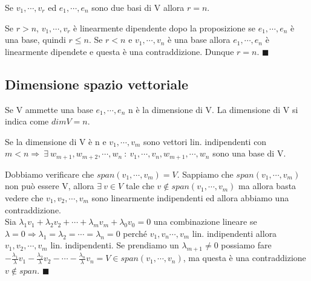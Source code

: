 \begin{corollaries}
Se $v_1, \cdots, v_r$ ed $e_1, \cdots, e_n$ sono due basi di V allora $r=n$.
\end{corollaries}

\begin{demostration}
Se $r>n$, $v_1, \cdots, v_r$ è linearmente dipendente dopo la proposizione se $e_1, \cdots, e_n$ è una base, quindi $r\leq n$. Se $r<n$ e $v_1, \cdots, v_n$ è una base allora $e_1, \cdots, e_n$ è linearmente dipendete e questa è una contraddizione. Dunque $r=n$. $\blacksquare$
\end{demostration}

\subsection{Dimensione spazio vettoriale}
\begin{definition}[Dimensione di un V]
Se V ammette una base $e_1, \cdots, e_n$ n è la dimensione di V. La dimensione di V si indica come $dim V = n$.
\end{definition}

\begin{corollaries}
Se la dimensione di V è n e $v_1, \cdots, v_m$ sono vettori lin. indipendenti con $m<n \Longrightarrow \:\exists\: w_{m+1}, w_{m+2}, \cdots, w_n \::\: v_1, \cdots, v_n, w_{m+1}, \cdots, w_n$ sono una base di V. 
\end{corollaries}

\begin{demostration}
Dobbiamo verificare che $span(v_1, \cdots, v_m) = V$. Sappiamo che $span(v_1, \cdots, v_m)$ non può essere V, allora $\exists\: v \in V$ tale che $v \notin span(v_1, \cdots, v_m)$ ma allora basta vedere che $v_1, v_2, \cdots, v_m$ sono linearmente indipendenti ed allora abbiamo una contraddizione.\\
Sia $\lambda_1v_1 + \lambda_2v_2 + \cdots + \lambda_mv_m + \lambda_0v_0 = 0$ una combinazione lineare se $\lambda=0 \Longrightarrow \lambda_1 = \lambda_2 = \cdots = \lambda_n = 0$ perché $v_1, v_n \cdots, v_m$ lin. indipendenti allora $v_1, v_2, \cdots, v_m$ lin. indipendenti. Se prendiamo un $\lambda_{m+1}\neq 0$ possiamo fare $-\frac{\lambda_1}{\lambda}v_1 - \frac{\lambda_2}{\lambda}v_2 - \cdots - \frac{\lambda_n}{\lambda}v_n = V \in span(v_1, \cdots, v_n)$, ma questa è una contraddizione $v \notin span$. $\blacksquare$
\end{demostration}


